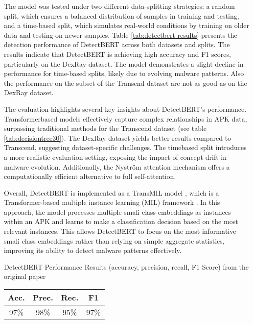 The model was tested under two different data-splitting strategies: a random split, 
which ensures a balanced distribution of samples in training and testing, 
and a time-based split, which simulates real-world conditions by training on older 
data and testing on newer samples. 
Table \ref{tab:detectbert-results} presents the detection performance of DetectBERT across both datasets 
and splits. The results indicate that DetectBERT is
achieving high accuracy and F1 scores, particularly on the DexRay dataset. 
The model demonstrates a slight decline in performance for time-based splits, 
likely due to evolving malware patterns. 
Also the performance on the subset of the Transend dataset are not as good as 
on the DexRay dataset.

The evaluation highlights several key insights about DetectBERT's performance. 
Transformerbased models effectively capture complex relationships in APK data, 
surpassing traditional methods for the Transcend dataset (see table \ref{tab:decisiontree30}). 
The DexRay dataset yields better results compared 
to Transcend, suggesting dataset-specific challenges. 
The timebased split introduces a more realistic evaluation setting, 
exposing the impact of concept drift in malware evolution. Additionally, 
the Nyström attention mechanism offers a computationally efficient alternative to 
full self-attention.

Overall, DetectBERT is implemented as a TransMIL model , which is a Transformer-based 
multiple instance learning (MIL) framework \cite{transmil}. 
In this approach, the model processes 
multiple smali class embeddings as instances within an APK and learns to make a 
classification decision based on the most relevant instances. This allows DetectBERT 
to focus on the most informative smali class embeddings rather than relying on 
simple aggregate statistics, improving its ability to detect malware patterns effectively.

\begin{margintable}[-30\baselineskip]
    \caption{\label{tab:detectbert_performance_original} DetectBERT Performance Results (accuracy, precision, recall, F1 Score) from the original paper \cite{detectbert}}
    \footnotesize
    \begin{tabular*}{\linewidth}{@{\extracolsep{\fill}} cccc@{}}
        \toprule
        \textbf{Acc.} & \textbf{Prec.} & \textbf{Rec.} & \textbf{F1} \\
        \midrule
        97\% & 98\% & 95\% & 97\% \\
        \bottomrule
    \end{tabular*}
\end{margintable}




